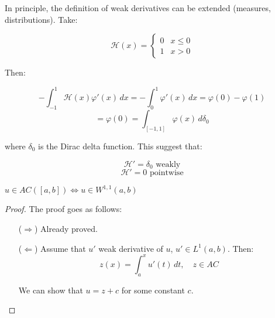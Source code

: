\begin{fremark}
    In principle, the definition of weak derivatives can be 
    extended (measures, distributions). Take:

    $$\mathcal{H}(x) = \begin{cases}
        0 & x \leq 0\\
        1 & x > 0
    \end{cases}$$

    Then:

    $$- \int_{-1}^1 \mathcal{H}(x) \varphi'(x) \, dx = - \int_0^1 \varphi'(x) \, dx = \varphi(0) - \varphi(1)$$
    $$= \varphi(0) = \int_{[-1, 1]} \varphi(x) \,  d\delta_0$$

    where $\delta_0$ is the Dirac delta function. This suggest that:

    $$\mathcal{H}' = \delta_0 \text{ weakly}$$
    $$\mathcal{H}' = 0 \text{ pointwise}$$
\end{fremark}

\vspace{1em}

\begin{ftheorem}
    $u \in AC([a, b]) \iff u \in W^{1,1}(a, b)$
\end{ftheorem}

\begin{proof}
    The proof goes as follows:
    \begin{itemize}
        \item[($\Rightarrow$)] Already proved.
        \item[($\Leftarrow$)] Assume that $u'$ weak derivative of $u$, $u' \in L^1(a, b)$.
        Then:
        $$z(x) = \int_a^x u'(t) \, dt, \quad z \in AC$$
        
        We can show that $u = z + c$ for some constant $c$.
    \end{itemize}
\end{proof}

